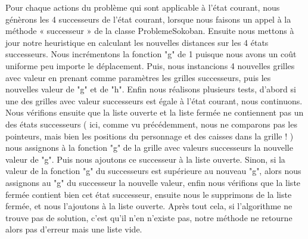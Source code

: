 \documentclass[a4paper,12pt]{article} %
\begin{document}
Pour chaque actions du problème qui sont applicable à l’état courant, nous génèrons les 4 successeurs de l’état courant, lorsque nous faisons un appel à la méthode « successeur » de la classe ProblemeSokoban. Ensuite nous mettons à jour notre heuristique en calculant les nouvelles distances sur les 4 états successeurs.
\newline\newline
Nous incrémentons la fonction "g" de 1 puisque nous avons un coût uniforme peu importe le déplacement.
\newline\newline
Puis, nous instancions 4 nouvelles grilles avec valeur en prenant comme paramètres les grilles successeurs, puis les nouvelles valeur de  "g" et de "h".
\newline\newline
Enfin nous réalisons plusieurs tests, d’abord si une des grilles avec valeur successeurs est égale à l’état courant, nous continuons. Nous vérifions ensuite que la liste ouverte et la liste fermée ne contiennent pas un des états successeurs ( ici, comme vu précédemment, nous ne comparons pas les pointeurs, mais bien les positions du personnage et des caisses dans la grille ! ) nous assignons à la fonction "g" de la grille avec valeurs successeurs la nouvelle valeur de "g".
\newline\newline
Puis nous ajoutons ce successeur à la liste ouverte.
\newline\newline
Sinon, si la valeur de la fonction "g" du successeurs est supérieure au nouveau "g", alors nous assignons au "g" du successeur la nouvelle valeur, enfin nous vérifions que la liste fermée contient bien cet état successeur, ensuite nous le supprimons de la liste fermée, et nous l’ajoutons à la liste ouverte.
\newline\newline
Après tout cela, si l’algorithme ne trouve pas de solution, c’est qu’il n'en n'existe pas, notre méthode ne retourne alors pas d'erreur mais une liste vide.
\newpage
\end{document}
